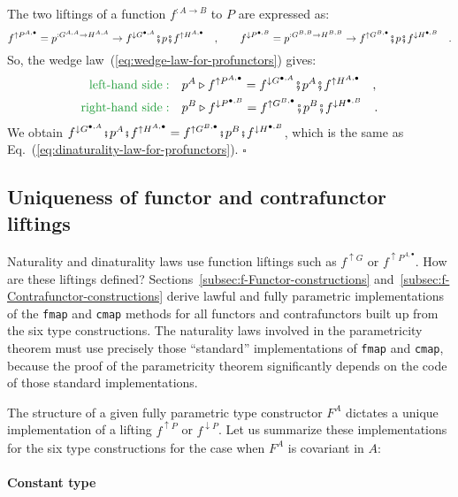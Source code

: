 The two liftings of a function $f^{:A\rightarrow B}$ to $P$ are
expressed as:
\[
f^{\uparrow P^{A,\bullet}}=p^{:G^{A,A}\rightarrow H^{A,A}}\rightarrow f^{\downarrow G^{\bullet,A}}\bef p\bef f^{\uparrow H^{A,\bullet}}\quad,\quad\quad f^{\downarrow P^{\bullet,B}}=p^{:G^{B,B}\rightarrow H^{B,B}}\rightarrow f^{\uparrow G^{B,\bullet}}\bef p\bef f^{\downarrow H^{\bullet,B}}\quad.
\]
So, the wedge law~(\ref{eq:wedge-law-for-profunctors}) gives:
\begin{align*}
{\color{greenunder}\text{left-hand side}:}\quad & p^{A}\triangleright f^{\uparrow P^{A,\bullet}}=f^{\downarrow G^{\bullet,A}}\bef p^{A}\bef f^{\uparrow H^{A,\bullet}}\quad,\\
{\color{greenunder}\text{right-hand side}:}\quad & p^{B}\triangleright f^{\downarrow P^{\bullet,B}}=f^{\uparrow G^{B,\bullet}}\bef p^{B}\bef f^{\downarrow H^{\bullet,B}}\quad.
\end{align*}
We obtain $f^{\downarrow G^{\bullet,A}}\bef p^{A}\bef f^{\uparrow H^{A,\bullet}}=f^{\uparrow G^{B,\bullet}}\bef p^{B}\bef f^{\downarrow H^{\bullet,B}}$,
which is the same as Eq.~(\ref{eq:dinaturality-law-for-profunctors}).
$\square$

\subsection{Uniqueness of functor and contrafunctor liftings\label{sec:Uniqueness-of-functor-and-contrafunctor}}

Naturality and dinaturality laws use function liftings such as $f^{\uparrow G}$
or $f^{\uparrow P^{A,\bullet}}$. How are these liftings defined?
Sections~\ref{subsec:f-Functor-constructions} and~\ref{subsec:f-Contrafunctor-constructions}
derive lawful and fully parametric implementations of the \lstinline!fmap!
and \lstinline!cmap! methods for all functors and contrafunctors
built up from the six type constructions. The naturality laws involved
in the parametricity theorem must use precisely those \textsf{``}standard\textsf{''}
implementations of \lstinline!fmap! and \lstinline!cmap!, because
the proof of the parametricity theorem significantly depends on the
code of those standard implementations.

The structure of a given fully parametric type constructor $F^{A}$
dictates a unique implementation of a lifting $f^{\uparrow P}$ or
$f^{\downarrow P}$. Let us summarize these implementations for the
six type constructions for the case when $F^{A}$ is covariant in
$A$:

\paragraph{Constant type}

